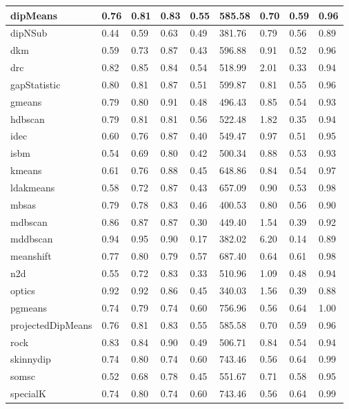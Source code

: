 \begin{table}[H]
\begin{tabular}{|l|l|l|l|l|l|l|l|l|}
\hline
dipMeans & 0.76 & 0.81 & 0.83 & 0.55 & 585.58 & 0.70 & 0.59 & 0.96 \\
\hline
dipNSub & 0.44 & 0.59 & 0.63 & 0.49 & 381.76 & 0.79 & 0.56 & 0.89 \\
\hline
dkm & 0.59 & 0.73 & 0.87 & 0.43 & 596.88 & 0.91 & 0.52 & 0.96 \\
\hline
drc & 0.82 & 0.85 & 0.84 & 0.54 & 518.99 & 2.01 & 0.33 & 0.94 \\
\hline
gapStatistic & 0.80 & 0.81 & 0.87 & 0.51 & 599.87 & 0.81 & 0.55 & 0.96 \\
\hline
gmeans & 0.79 & 0.80 & 0.91 & 0.48 & 496.43 & 0.85 & 0.54 & 0.93 \\
\hline
hdbscan & 0.79 & 0.81 & 0.81 & 0.56 & 522.48 & 1.82 & 0.35 & 0.94 \\
\hline
idec & 0.60 & 0.76 & 0.87 & 0.40 & 549.47 & 0.97 & 0.51 & 0.95 \\
\hline
isbm & 0.54 & 0.69 & 0.80 & 0.42 & 500.34 & 0.88 & 0.53 & 0.93 \\
\hline
kmeans & 0.61 & 0.76 & 0.88 & 0.45 & 648.86 & 0.84 & 0.54 & 0.97 \\
\hline
ldakmeans & 0.58 & 0.72 & 0.87 & 0.43 & 657.09 & 0.90 & 0.53 & 0.98 \\
\hline
mbsas & 0.79 & 0.78 & 0.83 & 0.46 & 400.53 & 0.80 & 0.56 & 0.90 \\
\hline
mdbscan & 0.86 & 0.87 & 0.87 & 0.30 & 449.40 & 1.54 & 0.39 & 0.92 \\
\hline
mddbscan & 0.94 & 0.95 & 0.90 & 0.17 & 382.02 & 6.20 & 0.14 & 0.89 \\
\hline
meanshift & 0.77 & 0.80 & 0.79 & 0.57 & 687.40 & 0.64 & 0.61 & 0.98 \\
\hline
n2d & 0.55 & 0.72 & 0.83 & 0.33 & 510.96 & 1.09 & 0.48 & 0.94 \\
\hline
optics & 0.92 & 0.92 & 0.86 & 0.45 & 340.03 & 1.56 & 0.39 & 0.88 \\
\hline
pgmeans & 0.74 & 0.79 & 0.74 & 0.60 & 756.96 & 0.56 & 0.64 & 1.00 \\
\hline
projectedDipMeans & 0.76 & 0.81 & 0.83 & 0.55 & 585.58 & 0.70 & 0.59 & 0.96 \\
\hline
rock & 0.83 & 0.84 & 0.90 & 0.49 & 506.71 & 0.84 & 0.54 & 0.94 \\
\hline
skinnydip & 0.74 & 0.80 & 0.74 & 0.60 & 743.46 & 0.56 & 0.64 & 0.99 \\
\hline
somsc & 0.52 & 0.68 & 0.78 & 0.45 & 551.67 & 0.71 & 0.58 & 0.95 \\
\hline
specialK & 0.74 & 0.80 & 0.74 & 0.60 & 743.46 & 0.56 & 0.64 & 0.99 \\

\end{tabular}
\end{table}
